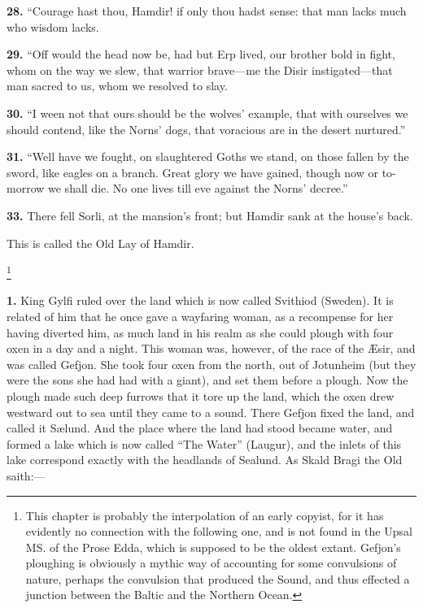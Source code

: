 \textbf{28.} ``Courage hast thou, Hamdir! if only thou hadst sense: that man
lacks much who wisdom lacks.

\textbf{29.} ``Off would the head now be, had but Erp lived, our brother bold
in fight, whom on the way we slew, that warrior brave—me the Disir
instigated—that man sacred to us, whom we resolved to slay.

\textbf{30.} ``I ween not that ours should be the wolves' example, that with
ourselves we should contend, like the Norns' dogs, that voracious are
in the desert nurtured.''

\textbf{31.} ``Well have we fought, on slaughtered Goths we stand, on those
fallen by the sword, like eagles on a branch. Great glory we have
gained, though now or to-morrow we shall die. No one lives till eve
against the Norns' decree.''

\textbf{33.} There fell Sorli, at the mansion's front; but Hamdir sank at the
house's back.

This is called the Old Lay of Hamdir.




\footnote{This chapter is probably the interpolation of an early
copyist, for it has evidently no connection with the following one,
and is not found in the Upsal MS. of the Prose Edda, which is supposed
to be the oldest extant. Gefjon's ploughing is obviously a mythic way
of accounting for some convulsions of nature, perhaps the convulsion
that produced the Sound, and thus effected a junction between the
Baltic and the Northern Ocean.}

\textbf{1.} King Gylfi ruled over the land which is now called Svithiod
(Sweden). It is related of him that he once gave a wayfaring woman, as
a recompense for her having diverted him, as much land in his realm as
she could plough with four oxen in a day and a night. This woman was,
however, of the race of the Æsir, and was called Gefjon. She took four
oxen from the north, out of Jotunheim (but they were the sons she had
had with a giant), and set them before a plough. Now the plough made
such deep furrows that it tore up the land, which the oxen drew
westward out to sea until they came to a sound. There Gefjon fixed the
land, and called it Sælund. And the place where the land had stood
became water, and formed a lake which is now called ``The Water''
(Laugur), and the inlets of this lake correspond exactly with the
headlands of Sealund. As Skald Bragi the Old saith:—

